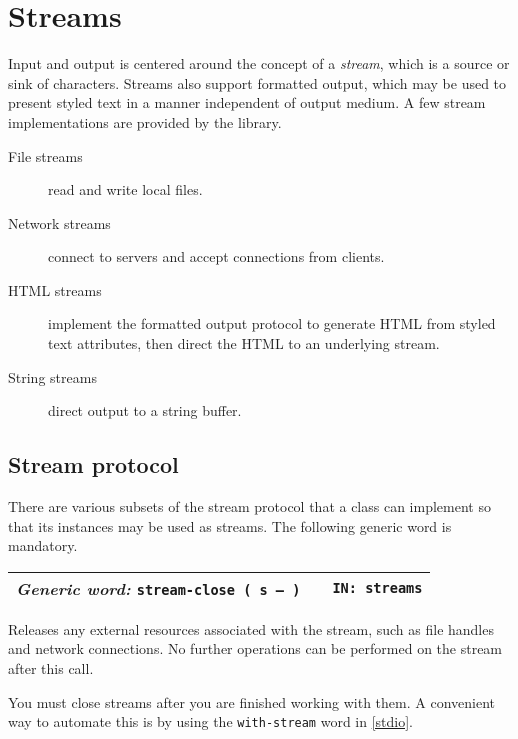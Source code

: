 \documentclass{report}
\newcommand{\genericword}[3]{\index{#1}
\emph{Generic word:} \texttt{#2} &&\texttt{IN: #3}}
\newcommand{\wordtable}[1]{

\begin{tabularx}{12cm}[t]{lXr}
\hline
#1\\
\hline
\end{tabularx}

}
\begin{document}
\section{Streams}

Input and output is centered around the concept of a \emph{stream}, which is a source or
sink of characters. Streams also support formatted output, which may be used to present styled text in a manner independent of output medium. A few stream implementations are provided by the library.

\begin{description}
\item[File streams] read and write local files.
\item[Network streams] connect to servers and accept connections from clients.
\item[HTML streams] implement the formatted output protocol to generate HTML from styled text attributes, then direct the HTML to an underlying stream.
\item[String streams] direct output to a string buffer.
\end{description}

\subsection{Stream protocol}

There are various subsets of the stream protocol that a class can implement so that its instances may be used as streams. The following generic word is mandatory.

\wordtable{
\genericword{stream-close}{stream-close ( s -- )}{streams}
}
Releases any external resources associated with the stream, such as file handles and network connections. No further operations can be performed on the stream after this call.

You must close streams after you are finished working with them. A convenient way to automate this is by using the \texttt{with-stream} word in \ref{stdio}.
\end{document}
